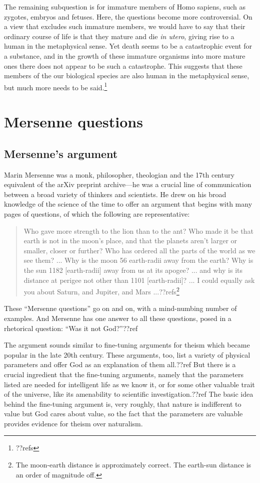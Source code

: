 The remaining subquestion is for immature members of Homo sapiens, such as zygotes, embryos and fetuses. Here, the questions become more controversial.
On a view that excludes such immature members, we would have to say that their ordinary course of life is that they mature and die \textit{in utero}, giving
rise to a human in the metaphysical sense. Yet death seems to be a catastrophic event for a substance, and in the growth of these immature organisms into more mature ones
there does not appear to be such a catastrophe. This suggests that these members of the our biological species are also human in the metaphysical sense, but much
more needs to be said.\footnote{??refs}

\section{Mersenne questions}
\subsection{Mersenne's argument}
Marin Mersenne was a monk, philosopher, theologian and the 17th century equivalent of the arXiv preprint archive---he was 
a crucial line of communication between a broad variety of thinkers and scientists. He drew on his broad knowledge of
the science of the time to offer an argument that begins with many pages of questions, of which the following are
representative:
\begin{quote}
Who gave more strength to the lion than to the ant?
Who made it be that earth is not in the moon's place, and that the planets aren't larger or smaller, closer or further?
Who has ordered all the parts of the world as we see them?
...
Why is the moon 56 earth-radii away from the earth? Why is the sun 1182 [earth-radii] away from us at its apogee? ... and why is its distance at perigee not other than 1101 [earth-radii]? ...
I could equally ask you about Saturn, and Jupiter, and Mars ...??refs\footnote{The moon-earth distance is approximately correct.
The earth-sun distance is an order of magnitude off.}
\end{quote}
These ``Mersenne questions'' go on and on, with a mind-numbing number of examples. And Mersenne has one answer to all
these questions, posed in a rhetorical question: ``Was it not God?''??ref

The argument sounds similar to fine-tuning arguments for theism which became popular in the late 20th century. These
arguments, too, list a variety of physical parameters and offer God as an explanation of them all.??ref But there is
a crucial ingredient that the fine-tuning arguments, namely that the parameters listed are needed for intelligent life
as we know it, or for some other valuable trait of the universe, like its amenability to scientific investigation.??ref
The basic idea behind the fine-tuning argument is, very roughly, that nature is indifferent to value but God cares 
about value, so the fact that the parameters are valuable provides evidence for theism over naturalism.

